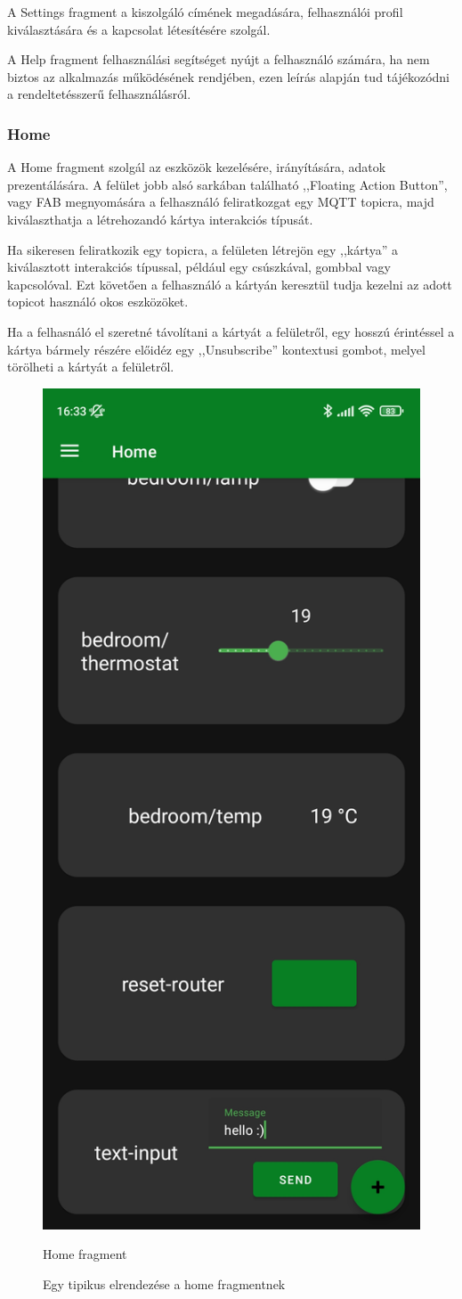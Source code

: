 \documentclass[
]{thesis-ekf}
\theoremstyle{definition}
\theoremstyle{remark}
\begin{document}
A Settings fragment a kiszolgáló címének megadására, felhasználói profil kiválasztására és a kapcsolat létesítésére
szolgál.

A Help fragment felhasználási segítséget nyújt a felhasználó számára, ha nem biztos az alkalmazás működésének rendjében,
ezen leírás alapján tud tájékozódni a rendeltetésszerű felhasználásról.
\subsubsection{Home}
A Home fragment szolgál az eszközök kezelésére, irányítására, adatok prezentálására.
A felület jobb alsó sarkában található ,,Floating Action Button'', vagy FAB megnyomására a felhasználó feliratkozgat egy MQTT
topicra, majd kiválaszthatja a létrehozandó kártya interakciós típusát. 

Ha sikeresen feliratkozik egy topicra, a felületen létrejön
egy ,,kártya'' a kiválasztott interakciós típussal, például egy csúszkával, gombbal vagy kapcsolóval. Ezt követően a felhasználó a
kártyán keresztül tudja kezelni az adott topicot használó okos eszközöket. 

Ha a felhasnáló el szeretné távolítani a kártyát a felületről,
egy hosszú érintéssel a kártya bármely részére előidéz egy ,,Unsubscribe'' kontextusi gombot, melyel törölheti a kártyát a felületről.

\begin{figure}[H]
	\centering
	\includegraphics[width=0.5\linewidth]{images/screen.jpg}
	\caption{Home fragment\cite{dashboard}}
	\caption{Egy tipikus elrendezése a home fragmentnek}
\end{figure}
\end{document}
